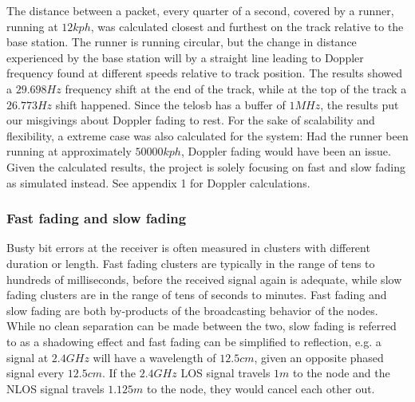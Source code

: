 \noindent The distance between a packet, every quarter of a second, covered by a runner, running at $12kph$, was calculated closest and furthest on the track relative to the base station. The runner is running circular, but the change in distance experienced by the base station will by a straight line leading to Doppler frequency found at different speeds relative to track position. The results showed a $29.698Hz$ frequency shift at the end of the track, while at the top of the track a $26.773Hz$ shift happened. Since the telosb has a buffer of $1MHz$, the results put our misgivings about Doppler fading to rest. For the sake of scalability and flexibility, a extreme case was also calculated for the system: Had the runner been running at approximately $50000kph$, Doppler fading would have been an issue. Given the calculated results, the project is solely focusing on fast and slow fading as simulated instead. See appendix 1 for Doppler calculations.

\subsubsection{Fast fading and slow fading}

Busty bit errors at the receiver is often measured in clusters with different duration or length. Fast fading clusters are typically in the range of tens to hundreds of milliseconds, before the received signal again is adequate, while slow fading clusters are in the range of tens of seconds to minutes. Fast fading and slow fading are both by-products of the broadcasting behavior of the nodes. While no clean separation can be made between the two, slow fading is referred to as a shadowing effect and fast fading can be simplified to reflection, e.g. a signal at $2.4GHz$ will have a wavelength of $12.5cm$, given an opposite phased signal every $12.5cm$. If the $2.4GHz$ LOS signal travels $1m$ to the node and the NLOS signal travels $1.125m$ to the node, they would cancel each other out.

